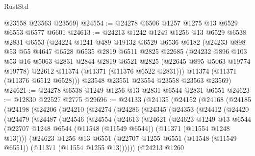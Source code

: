 \begin{lexlean}{RustStd}
\begin{coremodule}
      @23558
      @23563
      @23569)
@24554 := @24278 @6506 @1257 @1275 @13 @6529 @6553 @6577 @6601
@24613 := @24213
    @1242
    @1249
    @1256
    @13
    @6529
    @6538
    @2831
    @6553
    (@24224
      @1241
      @489
      @19132
      @6529
      @6536
      @6182
      (@24233
        @898
        @53
        @55
        @4647
        @6528
        @6535
        @2819
        @6511
        @2825
        @22685
        (@24232
          @896
          @103
          @53
          @16
          @5063
          @2831
          @2844
          @2819
          @6521
          @2825
          (@22645 @895 @5063 @19774 @19778)
          @22612
          @11374
          (@11371 (@11376 @6522 @2831)))
        @11374
        (@11371 (@11376 @6512 @6528)))
      @23548
      @23551
      @23554
      @23558
      @23563
      @23569)
@24621 := @24278 @6538 @1249 @1256 @13 @2831 @6544 @2831 @6551
@24623 := @12830 @22527 @2775
@29696 := @24133
    (@24135
      (@24152
        (@24168
          (@24185
            (@24198
              (@24206
                (@24210
                  (@24274
                    (@24286
                      (@24345
                        (@24353
                          (@24412
                            (@24420
                              (@24479
                                (@24487
                                  (@24546
                                    (@24554
                                      (@24613
                                        (@24621
                                          (@24623
                                            @1249
                                            @13
                                            @6544
                                            (@22707
                                              @1248
                                              @6544
                                              (@11548 (@11549 @6544))
                                              (@11371 (@11554 @1248 @13))))
                                          (@24623
                                            @1256
                                            @13
                                            @6551
                                            (@22707
                                              @1255
                                              @6551
                                              (@11548 (@11549 @6551))
                                              (@11371 (@11554 @1255 @13))))))
                                      (@24213
                                        @1260

\end{coremodule}
\end{lexlean}
